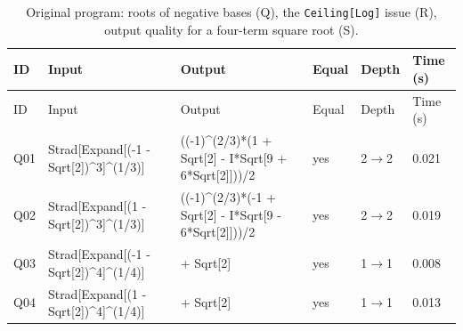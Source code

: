 \begin{longtable}{@{}p{}>{\ttfamily\footnotesize\raggedright\arraybackslash}p{}>{\ttfamily\footnotesize\raggedright\arraybackslash}p{}p{}p{}p{}@{}}
\caption{Original program: roots of negative bases (Q), the \texttt{Ceiling[Log]} issue (R), output quality for a four-term square root (S).}\label{tab:r3QRS}\\
\toprule ID & Input & Output & Equal & Depth & Time (s)\\\midrule\endfirsthead
\toprule ID & Input & Output & Equal & Depth & Time (s)\\\midrule\endhead
\bottomrule\endfoot
Q01 & Strad[\allowbreak{}Expand[\allowbreak{}(\allowbreak{}-1 -\allowbreak{} Sqrt[\allowbreak{}2]\allowbreak{})\allowbreak{}\textasciicircum{}\allowbreak{}3]\allowbreak{}\textasciicircum{}\allowbreak{}(\allowbreak{}1/\allowbreak{}3)\allowbreak{}]\allowbreak{} & (\allowbreak{}(\allowbreak{}-1)\allowbreak{}\textasciicircum{}\allowbreak{}(\allowbreak{}2/\allowbreak{}3)\allowbreak{}*\allowbreak{}(\allowbreak{}1 +\allowbreak{} Sqrt[\allowbreak{}2]\allowbreak{} -\allowbreak{} I*\allowbreak{}Sqrt[\allowbreak{}9 +\allowbreak{} 6*\allowbreak{}Sqrt[\allowbreak{}2]\allowbreak{}]\allowbreak{})\allowbreak{})\allowbreak{}/\allowbreak{}2 & yes & 2$\to$2 & 0.021\\
Q02 & Strad[\allowbreak{}Expand[\allowbreak{}(\allowbreak{}1 -\allowbreak{} Sqrt[\allowbreak{}2]\allowbreak{})\allowbreak{}\textasciicircum{}\allowbreak{}3]\allowbreak{}\textasciicircum{}\allowbreak{}(\allowbreak{}1/\allowbreak{}3)\allowbreak{}]\allowbreak{} & (\allowbreak{}(\allowbreak{}-1)\allowbreak{}\textasciicircum{}\allowbreak{}(\allowbreak{}2/\allowbreak{}3)\allowbreak{}*\allowbreak{}(\allowbreak{}-1 +\allowbreak{} Sqrt[\allowbreak{}2]\allowbreak{} -\allowbreak{} I*\allowbreak{}Sqrt[\allowbreak{}9 -\allowbreak{} 6*\allowbreak{}Sqrt[\allowbreak{}2]\allowbreak{}]\allowbreak{})\allowbreak{})\allowbreak{}/\allowbreak{}2 & yes & 2$\to$2 & 0.019\\
Q03 & Strad[\allowbreak{}Expand[\allowbreak{}(\allowbreak{}-1 -\allowbreak{} Sqrt[\allowbreak{}2]\allowbreak{})\allowbreak{}\textasciicircum{}\allowbreak{}4]\allowbreak{}\textasciicircum{}\allowbreak{}(\allowbreak{}1/\allowbreak{}4)\allowbreak{}]\allowbreak{} & 1 +\allowbreak{} Sqrt[\allowbreak{}2]\allowbreak{} & yes & 1$\to$1 & 0.008\\
Q04 & Strad[\allowbreak{}Expand[\allowbreak{}(\allowbreak{}1 -\allowbreak{} Sqrt[\allowbreak{}2]\allowbreak{})\allowbreak{}\textasciicircum{}\allowbreak{}4]\allowbreak{}\textasciicircum{}\allowbreak{}(\allowbreak{}1/\allowbreak{}4)\allowbreak{}]\allowbreak{} & -1 +\allowbreak{} Sqrt[\allowbreak{}2]\allowbreak{} & yes & 1$\to$1 & 0.013\\

\end{longtable}
